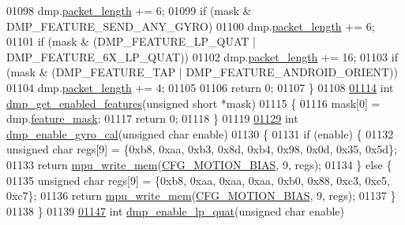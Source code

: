 \begin{DoxyCode}
01098         dmp.\hyperlink{structdmp__s_a6423143ff761c75d97f34c8465393ea0}{packet\_length} += 6;
01099     \textcolor{keywordflow}{if} (mask & DMP\_FEATURE\_SEND\_ANY\_GYRO)
01100         dmp.\hyperlink{structdmp__s_a6423143ff761c75d97f34c8465393ea0}{packet\_length} += 6;
01101     \textcolor{keywordflow}{if} (mask & (DMP\_FEATURE\_LP\_QUAT | DMP\_FEATURE\_6X\_LP\_QUAT))
01102         dmp.\hyperlink{structdmp__s_a6423143ff761c75d97f34c8465393ea0}{packet\_length} += 16;
01103     \textcolor{keywordflow}{if} (mask & (DMP\_FEATURE\_TAP | DMP\_FEATURE\_ANDROID\_ORIENT))
01104         dmp.\hyperlink{structdmp__s_a6423143ff761c75d97f34c8465393ea0}{packet\_length} += 4;
01105 
01106     \textcolor{keywordflow}{return} 0;
01107 \}
01108 
\hypertarget{inv__mpu__dmp__motion__driver_8c_source.tex_l01114}{}\hyperlink{group___d_r_i_v_e_r_s_ga92b920b72f5146ea14d45ad2d529b64c}{01114} \textcolor{keywordtype}{int} \hyperlink{group___d_r_i_v_e_r_s_ga92b920b72f5146ea14d45ad2d529b64c}{dmp\_get\_enabled\_features}(\textcolor{keywordtype}{unsigned} \textcolor{keywordtype}{short} *mask)
01115 \{
01116     mask[0] = dmp.\hyperlink{structdmp__s_ac1c048fa56b613b3223d2e66ac2c050f}{feature\_mask};
01117     \textcolor{keywordflow}{return} 0;
01118 \}
01119 
\hypertarget{inv__mpu__dmp__motion__driver_8c_source.tex_l01129}{}\hyperlink{group___d_r_i_v_e_r_s_ga653ebcec6758f006dd89939e8f3c6ebb}{01129} \textcolor{keywordtype}{int} \hyperlink{group___d_r_i_v_e_r_s_ga653ebcec6758f006dd89939e8f3c6ebb}{dmp\_enable\_gyro\_cal}(\textcolor{keywordtype}{unsigned} \textcolor{keywordtype}{char} enable)
01130 \{
01131     \textcolor{keywordflow}{if} (enable) \{
01132         \textcolor{keywordtype}{unsigned} \textcolor{keywordtype}{char} regs[9] = \{0xb8, 0xaa, 0xb3, 0x8d, 0xb4, 0x98, 0x0d, 0x35, 0x5d\};
01133         \textcolor{keywordflow}{return} \hyperlink{group___d_r_i_v_e_r_s_gafea59910bc3dd30ba3356b1c75213a5f}{mpu\_write\_mem}(\hyperlink{group___d_r_i_v_e_r_s_ga8214527cbba23694722d04715126be0f}{CFG\_MOTION\_BIAS}, 9, regs);
01134     \} \textcolor{keywordflow}{else} \{
01135         \textcolor{keywordtype}{unsigned} \textcolor{keywordtype}{char} regs[9] = \{0xb8, 0xaa, 0xaa, 0xaa, 0xb0, 0x88, 0xc3, 0xc5, 0xc7\};
01136         \textcolor{keywordflow}{return} \hyperlink{group___d_r_i_v_e_r_s_gafea59910bc3dd30ba3356b1c75213a5f}{mpu\_write\_mem}(\hyperlink{group___d_r_i_v_e_r_s_ga8214527cbba23694722d04715126be0f}{CFG\_MOTION\_BIAS}, 9, regs);
01137     \}
01138 \}
01139 
\hypertarget{inv__mpu__dmp__motion__driver_8c_source.tex_l01147}{}\hyperlink{group___d_r_i_v_e_r_s_ga4ee4339b79a58558d121ba8206056394}{01147} \textcolor{keywordtype}{int} \hyperlink{group___d_r_i_v_e_r_s_ga4ee4339b79a58558d121ba8206056394}{dmp\_enable\_lp\_quat}(\textcolor{keywordtype}{unsigned} \textcolor{keywordtype}{char} enable)

\end{DoxyCode}
